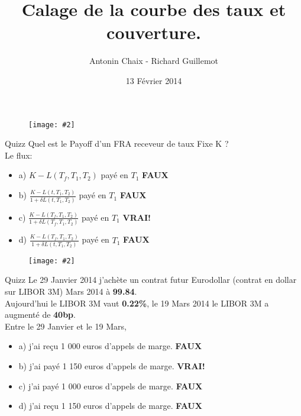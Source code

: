 \documentclass{beamer}
\title[Produits dérivés de taux]{Calage de la courbe des taux et couverture.}
\author{Antonin Chaix - Richard Guillemot}
\institute{Master IFMA}
\date{13 Février 2014}
\newcommand{\FIG}[2]{\texttt{[image: \#2]}}
\begin{document}
\begin{frame}
\titlepage
\begin{figure}[h]
\centering \FIG{5cm}{figures/UPMC_IFMA.jpg}
\end{figure}

\end{frame}

\begin{frame}{Quizz}
Quel est le Payoff d'un FRA receveur de taux Fixe K ?\\
\vspace{0.5cm}
Le flux:
\begin{itemize}
\item a) $K - L(T_f,T_{1},T_{2})$ payé en $T_1$ \textbf{\color{red}FAUX}
\item b) $\frac{K - L(t,T_{1},T_{2})}{1+\delta  L(t,T_{1},T_{2})}$ payé en $T_1$ \textbf{\color{red}FAUX}
\item c) $\frac{K - L(T_f,T_{1},T_{2})}{1+\delta  L(T_f,T_{1},T_{2})}$ payé en $T_1$ \textbf{\color{green}VRAI!}
\item d) $\frac{K - L(T_f,T_{1},T_{2})}{1+\delta  L(t,T_{1},T_{2})}$ payé en $T_1$ \textbf{\color{red}FAUX}
\end{itemize}
\begin{figure}[h]
\FIG{10cm}{figures/schema_fra.jpg}
\end{figure}

\end{frame}

\begin{frame}{Quizz}
Le 29 Janvier 2014 j'achète un contrat futur Eurodollar (contrat en dollar sur LIBOR 3M) Mars 2014 à \textbf{99.84}.\\
Aujourd'hui le LIBOR 3M vaut \textbf{0.22\%}, le 19 Mars 2014 le LIBOR 3M a augmenté de \textbf{40bp}.\\
\vspace{0.5cm}
Entre le 29 Janvier et le 19 Mars,\\
\begin{itemize}
\item a) j'ai reçu 1 000 euros d'appels de marge. \textbf{\color{red}FAUX}
\item b) j'ai payé 1 150 euros d'appels de marge. \textbf{\color{green}VRAI!}
\item c) j'ai payé 1 000 euros d'appels de marge. \textbf{\color{red}FAUX}
\item d) j'ai reçu 1 150 euros d'appels de marge. \textbf{\color{red}FAUX}

\end{itemize}
\end{frame}
\end{document}
